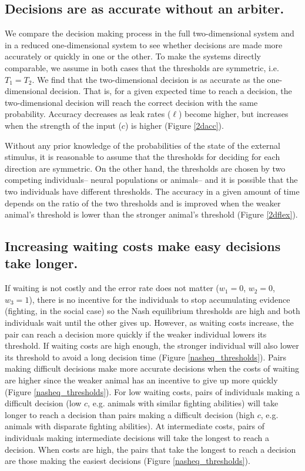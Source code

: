 \documentclass{article}
\begin{document}
\subsection{Decisions are as accurate without an arbiter. }
We compare the decision making process in the full two-dimensional system and in a reduced one-dimensional system to see whether decisions are made more accurately or quickly in one or the other.  To make the systems directly comparable, we assume in both cases that the thresholds are symmetric, i.e. $T_1=T_2$.  We find that the two-dimensional decision is as accurate as the one-dimensional decision.  That is, for a given expected time to reach a decision, the two-dimensional decision will reach the correct decision with the same probability.  Accuracy decreases as leak rates ($\ell$) become higher, but increases when the strength of the input ($c$) is higher (Figure \ref{2dacc}).

Without any prior knowledge of the probabilities of the state of the external stimulus, it is reasonable to assume that the thresholds for deciding for each direction are symmetric.  On the other hand, the thresholds are chosen by two competing individuals-- neural populations or animals-- and it is possible that the two individuals have different thresholds.  The accuracy in a given amount of time depends on the ratio of the two thresholds and is improved when the weaker animal's threshold is lower than the stronger animal's threshold (Figure \ref{2dflex}).  

\subsection{Increasing waiting costs make easy decisions take longer. }

If waiting is not costly and the error rate does not matter ($w_1=0$, $w_2=0$, $w_3=1$), there is no incentive for the individuals to stop accumulating evidence (fighting, in the social case) so the Nash equilibrium thresholds are high and both individuals wait until the other gives up.  However, as waiting costs increase, the pair can reach a decision more quickly if the weaker individual lowers its threshold.  If waiting costs are high enough, the stronger individual will also lower its threshold to avoid a long decision time (Figure \ref{nasheq_thresholds}).  Pairs making difficult decisions make more accurate decisions when the costs of waiting are higher since the weaker animal has an incentive to give up more quickly (Figure \ref{nasheq_thresholds}).  For low waiting costs, pairs of individuals making a difficult decision (low $c$, e.g. animals with similar fighting abilities) will take longer to reach a decision than pairs making a difficult decision (high $c$, e.g. animals with disparate fighting abilities).  At intermediate costs, pairs of individuals making intermediate decisions will take the longest to reach a decision.  When costs are high, the pairs that take the longest to reach a decision are those making the easiest decisions (Figure \ref{nasheq_thresholds}).  
\end{document}

